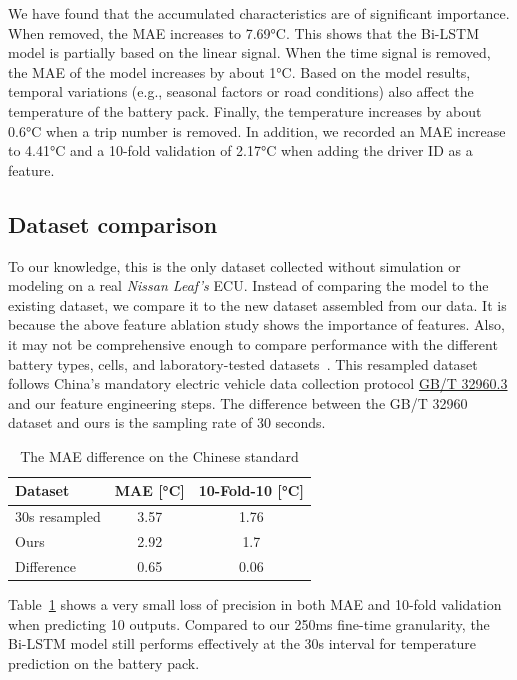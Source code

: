 We have found that the accumulated characteristics are of significant importance. 
When removed, the \gls{MAE} increases to 7.69°C. This shows that the Bi-LSTM model is partially based on the linear signal.
When the time signal is removed, the \gls{MAE} of the model increases by about 1°C. 
Based on the model results, temporal variations (e.g., seasonal factors or road conditions) also affect the temperature of the battery pack. 
Finally, the temperature increases by about 0.6°C when a trip number is removed. 
In addition, we recorded an \gls{MAE} increase to 4.41°C and a 10-fold validation of 2.17°C when adding the driver ID as a feature.

\subsection{Dataset comparison}

To our knowledge, this is the only dataset collected without simulation or modeling on a real \textit{Nissan Leaf's} \gls{ECU}. 
Instead of comparing the model to the existing dataset, we compare it to the new dataset assembled from our data. 
It is because the above feature ablation study shows the importance of features. 
Also, it may not be comprehensive enough to compare performance with the different battery types, cells, and laboratory-tested datasets~\cite{DOSREIS2021100081}. 
This resampled dataset follows China's mandatory electric vehicle data collection protocol \href{https://openstd.samr.gov.cn/bzgk/gb/newGbInfo?hcno=674DE45C0AD3DE2CD75B9C4CD8ED57C1}{GB/T 32960.3} and our feature engineering steps. 
The difference between the GB/T 32960 dataset and ours is the sampling rate of 30 seconds.

\begin{table}[hbt]
    \centering
    \caption{The \gls{MAE} difference on the Chinese standard}
    \label{tab:gbt32960}
    \begin{tabular}{lcc}
    \toprule
        Dataset & \gls{MAE} [°C] & 10-Fold-10 [°C] \\ 
        \midrule
        30s resampled & 3.57 & 1.76 \\ 
        Ours & 2.92 & 1.7 \\ 
        \midrule
        Difference & 0.65 & 0.06 \\
        \bottomrule
    \end{tabular}
\end{table}

Table~\ref{tab:gbt32960} shows a very small loss of precision in both \gls{MAE} and 10-fold validation when predicting 10 outputs. 
Compared to our 250ms fine-time granularity, the Bi-LSTM model still performs effectively at the 30s interval for temperature prediction on the battery pack.

